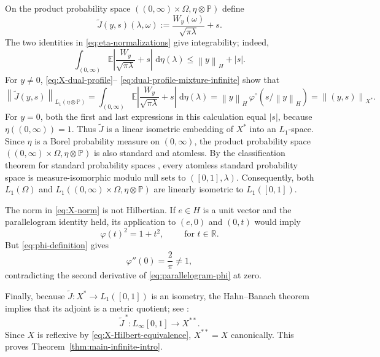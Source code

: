 \documentclass[11pt]{article}
\theoremstyle{definition}
\theoremstyle{remark}
\newcommand{\R}{\mathbb R}
\newcommand{\dd}{\,\mathrm d}
\newcommand{\E}{\mathbb E}
\newcommand{\abs}[1]{\left|#1\right|}
\newcommand{\norm}[1]{\left\|#1\right\|}
\begin{document}

On the product probability space
$((0,\infty)\times\Omega,\eta\otimes\mathbb P)$ define
\begin{equation}\label{eq:J-tilde-embedding}
 \widetilde J(y,s)(\lambda,\omega)
 :=\frac{W_y(\omega)}{\sqrt{\pi\lambda}}+s.
\end{equation}
The two identities in \eqref{eq:eta-normalizations} give
integrability; indeed,
\[
 \int_{(0,\infty)}
 \E\abs{\frac{W_y}{\sqrt{\pi\lambda}}+s}\,\dd\eta(\lambda)
 \leq \norm{y}_H+\abs s.
\]
For $y\neq0$, \eqref{eq:X-dual-profile}--
\eqref{eq:dual-profile-mixture-infinite} show that
$$
 \norm{\widetilde J(y,s)}_{L_1(\eta\otimes\mathbb P)}
 =\int_{(0,\infty)}
 \E\abs{\frac{W_y}{\sqrt{\pi\lambda}}+s}
\,\dd\eta(\lambda)=\norm{y}_H\,\varphi^\circ(s/\norm{y}_H)
 =\norm{(y,s)}_{X^*}.
$$
For $y=0$, both the first and last expressions in this
calculation equal $\abs s$, because $\eta((0,\infty))=1$.  Thus
$\widetilde J$ is a linear isometric embedding of $X^*$ into an
$L_1$-space.  Since $\eta$ is
a Borel probability measure on $(0,\infty)$, the product probability
space $((0,\infty)\times\Omega,\eta\otimes\mathbb P)$ is also standard
and atomless.  By the classification theorem for standard 
probability spaces
\cite[Theorem~9.4.7, pp.~282--283]{Bogachev2007}, every atomless
standard probability space is measure-isomorphic modulo null sets to
$([0,1],\lambda)$.  Consequently, both $L_1(\Omega)$ and
$L_1((0,\infty)\times\Omega,\eta\otimes\mathbb P)$ are linearly
isometric to $L_1([0,1])$.

The norm in \eqref{eq:X-norm} is not Hilbertian.  If $e\in H$ is a
unit vector and the parallelogram identity held, its application to
$(e,0)$ and $(0,t)$ would imply
\begin{equation}\label{eq:parallelogram-phi}
 \varphi(t)^2=1+t^2,
 \qquad \mbox{ for } t\in\R.
\end{equation}
But \eqref{eq:phi-definition} gives
\begin{equation}\label{eq:phi-second-zero}
 \varphi''(0)=\frac2\pi\neq1,
\end{equation}
contradicting the second derivative of
\eqref{eq:parallelogram-phi} at zero.

Finally, because $\widetilde J:X^*\to L_1([0,1])$ is an
isometry, the Hahn--Banach theorem implies that its adjoint is a
metric quotient; see
\cite[Theorem~3.3 and Chapter~4]{Rudin1991}:
\begin{equation}\label{eq:L-infty-quotient}
 \widetilde J^{\,*}:L_\infty[0,1]\longrightarrow X^{**}.
\end{equation}
Since $X$ is reflexive by
\eqref{eq:X-Hilbert-equivalence}, $X^{**}=X$ canonically.  This proves
Theorem~\ref{thm:main-infinite-intro}.
\end{document}
